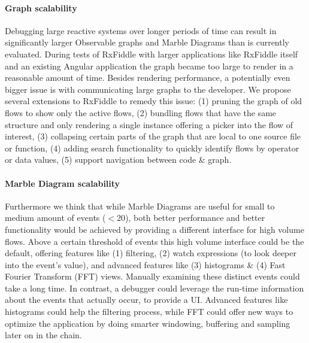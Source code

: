 \paragraph{Graph scalability} Debugging large reactive systems over
longer periods of time can result in significantly larger Observable
graphs and Marble Diagrams than is currently evaluated.  During tests of
RxFiddle with larger applications like RxFiddle itself and an existing
Angular application the graph became too large to render in a reasonable
amount of time.  Besides rendering performance, a potentially even
bigger issue is with communicating large graphs to the developer.  We
propose several extensions to RxFiddle to remedy this issue:  (1)
pruning the graph of old flows to show only the active flows, (2)
bundling flows that have the same structure and only rendering a single
instance offering a picker into the flow of interest, (3) collapsing
certain parts of the graph that are local to one source file or
function, (4) adding search functionality to quickly identify flows by
operator or data values, (5) support navigation between code \& graph.

\paragraph{Marble Diagram scalability} Furthermore we think that while
Marble Diagrams are useful for small to medium amount of events ($ < 20 $),
both better performance and better functionality would be achieved by
providing a different interface for high volume flows.  Above a certain
threshold of events this high volume interface could be the default,
offering features like (1) filtering, (2) watch expressions (to look
deeper into the event's value), and advanced features like (3)
histograms \& (4) Fast Fourier Transform (FFT) views.  Manually
examining these distinct events could take a long time.  In contrast, a
debugger could leverage the run-time information about the events that
actually occur, to provide a UI.  Advanced features like histograms
could help the filtering process, while FFT could offer new ways to
optimize the application by doing smarter windowing, buffering and
sampling later on in the chain.

